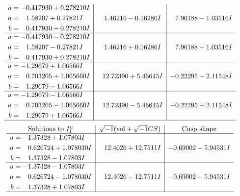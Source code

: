 \documentclass[1p]{elsarticle_modified}
\theoremstyle{definition}
\newcommand{\I}{\sqrt{-1}}
\begin{document}
$$\begin{array}{c|c|c}
\begin{aligned}
u &= -0.417930 + 0.278210 I \\
a &= \phantom{-}1.58207 + 0.27821 I \\
b &= \phantom{-}0.417930 - 0.278210 I\end{aligned}
 & \phantom{-}1.46216 - 0.16286 I & \phantom{-}7.96188 - 1.03516 I \\ \hline\begin{aligned}
u &= -0.417930 - 0.278210 I \\
a &= \phantom{-}1.58207 - 0.27821 I \\
b &= \phantom{-}0.417930 + 0.278210 I\end{aligned}
 & \phantom{-}1.46216 + 0.16286 I & \phantom{-}7.96188 + 1.03516 I \\ \hline\begin{aligned}
u &= -1.29679 + 1.06566 I \\
a &= \phantom{-}0.703205 + 1.065660 I \\
b &= \phantom{-}1.29679 - 1.06566 I\end{aligned}
 & \phantom{-}12.72390 + 5.46645 I & -0.22295 - 2.11548 I \\ \hline\begin{aligned}
u &= -1.29679 - 1.06566 I \\
a &= \phantom{-}0.703205 - 1.065660 I \\
b &= \phantom{-}1.29679 + 1.06566 I\end{aligned}
 & \phantom{-}12.72390 - 5.46645 I & -0.22295 + 2.11548 I\\
 \hline 
 \end{array}$$\newpage$$\begin{array}{c|c|c}  
\text{Solutions to }I^u_{1}& \I (\text{vol} + \sqrt{-1}CS) & \text{Cusp shape}\\
 \hline 
\begin{aligned}
u &= -1.37328 + 1.07803 I \\
a &= \phantom{-}0.626724 + 1.078030 I \\
b &= \phantom{-}1.37328 - 1.07803 I\end{aligned}
 & \phantom{-}12.4026 + 12.7511 I & -0.69002 - 5.94531 I \\ \hline\begin{aligned}
u &= -1.37328 - 1.07803 I \\
a &= \phantom{-}0.626724 - 1.078030 I \\
b &= \phantom{-}1.37328 + 1.07803 I\end{aligned}
 & \phantom{-}12.4026 - 12.7511 I & -0.69002 + 5.94531 I\\
 \hline 
 \end{array}$$\newpage\newpage\renewcommand{\arraystretch}{1}
\end{document}
